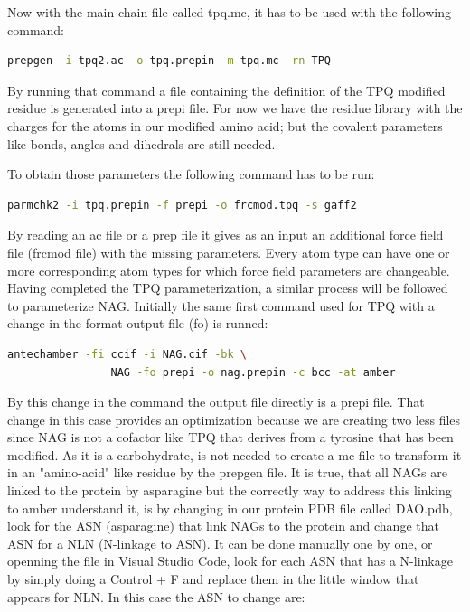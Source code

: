 \documentclass[a4paper]{article}
\begin{document}
Now with the main chain file called tpq.mc, it has to be used with the following command:

\begin{lstlisting}[language=Bash,caption={Prepgen command for TPQ}]
    prepgen -i tpq2.ac -o tpq.prepin -m tpq.mc -rn TPQ
\end{lstlisting}

By running that command a file containing the definition of the TPQ modified residue is generated into a prepi file. For now we have the residue library with the charges for the atoms in our modified amino acid; but the covalent parameters like bonds, angles and dihedrals are still needed.

To obtain those parameters the following command has to be run:

\begin{lstlisting}[language=Bash,caption={Parmchk2 command}]
    parmchk2 -i tpq.prepin -f prepi -o frcmod.tpq -s gaff2
\end{lstlisting}

By reading an ac file or a prep file it gives as an input an additional force field file (frcmod file) with the missing parameters. Every atom type can have one or more corresponding atom types for which force field parameters are changeable.
Having completed the TPQ parameterization, a similar process will be followed to parameterize NAG.
Initially the same first command used for TPQ with a change in the format output file (fo) is runned:

\begin{lstlisting}[language=Bash,caption={Antechamber for NAG}]
    antechamber -fi ccif -i NAG.cif -bk \
                NAG -fo prepi -o nag.prepin -c bcc -at amber
\end{lstlisting}

By this change in the command the output file directly is a prepi file. That change in this case provides an optimization because we are creating two less files since NAG is not a cofactor like TPQ that derives from a tyrosine that has been modified. As it is a carbohydrate, is not needed to create a mc file to transform it in an "amino-acid" like residue by the prepgen file. It is true, that all NAGs are linked to the protein by asparagine but the correctly way to address this linking to amber understand it, is by changing in our protein PDB file called DAO.pdb, look for the ASN (asparagine) that link NAGs to the protein and change that ASN for a NLN (N-linkage to ASN). It can be done manually one by one, or openning the file in Visual Studio Code, look for each ASN that has a N-linkage by simply doing a Control + F and replace them in the little window that appears for NLN. In this case the ASN to change are:
\end{document}
